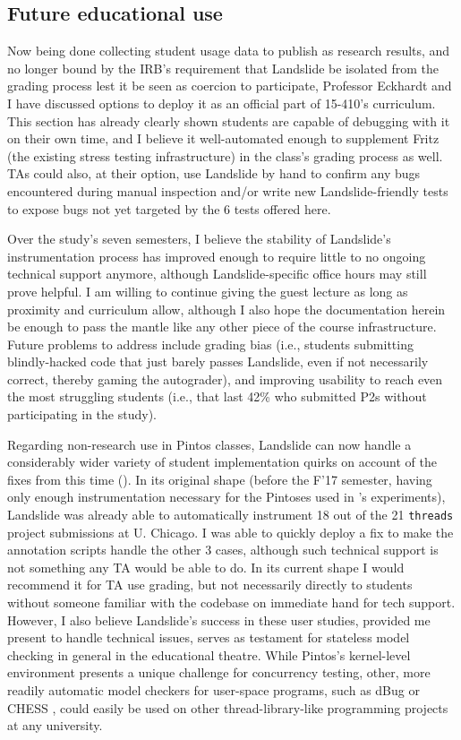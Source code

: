 \subsection{Future educational use}

Now being done collecting student usage data to publish as research results,
and no longer bound by the IRB's requirement that Landslide be isolated from the grading process
lest it be seen as coercion to participate,
Professor Eckhardt and I have discussed options to deploy it as an official part of 15-410's curriculum.
This section has already clearly shown students are capable of debugging with it on their own time,
and I believe it well-automated enough to supplement Fritz (the existing stress testing infrastructure)
in the class's grading process as well.
TAs could also, at their option, use Landslide by hand to confirm any bugs encountered during manual inspection
and/or write new Landslide-friendly tests to expose bugs not yet targeted by the 6 tests offered here.

Over the study's seven semesters,
I believe the stability of Landslide's instrumentation process has improved enough
to require little to no ongoing technical support anymore,
although Landslide-specific office hours may still prove helpful.
I am willing to continue giving the guest lecture as long as proximity and curriculum allow,
although I also hope the documentation herein be enough to pass the mantle like any other piece of the course infrastructure.
Future problems to address include grading bias
(i.e., students submitting blindly-hacked code that just barely passes Landslide,
even if not necessarily correct,
thereby gaming the autograder),
and improving usability to reach even the most struggling students
(i.e., that last 42\% who submitted P2s without participating in the study).

Regarding non-research use in Pintos classes,
Landslide can now handle a considerably wider variety of student implementation quirks
on account of the fixes from this time (\sect{\ref{sec:education-pintos-instrumentation}}).
In its original shape
(before the F'17 semester,
having only enough instrumentation necessary for the Pintoses used in \sect{\ref{sec:quicksand-eval}}'s experiments),
Landslide was already able to automatically instrument 18 out of the 21 {\tt threads} project submissions at U. Chicago.
I was able to quickly deploy a fix to make the annotation scripts handle the other 3 cases,
although such technical support is not something any TA would be able to do.
%
In its current shape I would recommend it for TA use grading,
but not necessarily directly to students without someone familiar with the codebase on immediate hand for tech support.
However, I also believe Landslide's success in these user studies,
provided me present to handle technical issues,
serves as testament for stateless model checking in general in the educational theatre.
While Pintos's kernel-level environment presents a unique challenge for concurrency testing,
other, more readily automatic model checkers for user-space programs,
such as dBug \cite{dbug-ssv} or CHESS \cite{chess},
could easily be used on other thread-library-like programming projects at any university.

